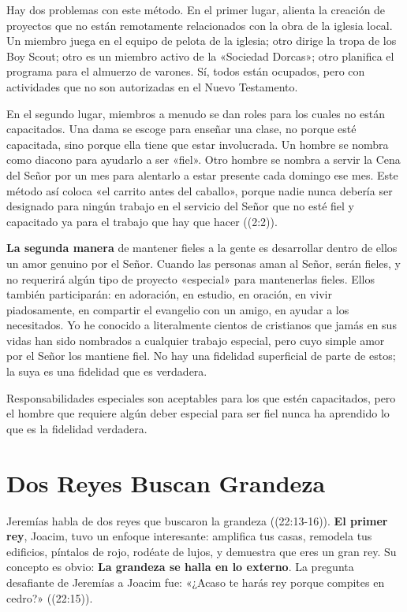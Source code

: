 \documentclass[12pt, twoside, openright]{book}
\begin{document}
Hay dos problemas con este método. En el primer lugar, alienta la creación de proyectos que no están remotamente relacionados con la obra de la iglesia local. Un miembro juega en el equipo de pelota de la iglesia; otro dirige la tropa de los Boy Scout; otro es un miembro activo de la «Sociedad Dorcas»; otro planifica el programa para el almuerzo de varones. Sí, todos están ocupados, pero con actividades que no son autorizadas en el Nuevo Testamento. 

En el segundo lugar, miembros a menudo se dan roles para los cuales no están capacitados. Una dama se escoge para enseñar una clase, no porque esté capacitada, sino porque ella tiene que estar involucrada. Un hombre se nombra como diacono para ayudarlo a ser «fiel». Otro hombre se nombra a servir la Cena del Señor por un mes para alentarlo a estar presente cada domingo ese mes. Este método así coloca «el carrito antes del caballo», porque nadie nunca debería ser designado para ningún trabajo en el servicio del Señor que no esté fiel y capacitado ya para el trabajo que hay que hacer ((2:2)).

\textbf{La segunda manera} de mantener fieles a la gente es desarrollar dentro de ellos un amor genuino por el Señor. Cuando las personas aman al Señor, serán fieles, y no requerirá algún tipo de proyecto «especial» para mantenerlas fieles. Ellos también participarán: en adoración, en estudio, en oración, en vivir piadosamente, en compartir el evangelio con un amigo, en ayudar a los necesitados. Yo he conocido a literalmente cientos de cristianos que jamás en sus vidas han sido nombrados a cualquier trabajo especial, pero cuyo simple amor por el Señor los mantiene fiel. No hay una fidelidad superficial de parte de estos; la suya es una fidelidad que es verdadera. 

Responsabilidades especiales son aceptables para los que estén capacitados, pero el hombre que requiere algún deber especial para ser fiel nunca ha aprendido lo que es la fidelidad verdadera. 

\section{Dos Reyes Buscan Grandeza}
Jeremías habla de dos reyes que buscaron la grandeza ((22:13-16)). \textbf{El primer rey}, Joacim, tuvo un enfoque interesante: amplifica tus casas, remodela tus edificios, píntalos de rojo, rodéate de lujos, y demuestra que eres un gran rey. Su concepto es obvio: \textbf{La grandeza se halla en lo externo}. La pregunta desafiante de Jeremías a Joacim fue: «¿Acaso te harás rey porque compites en cedro?» ((22:15)). 
\end{document}

